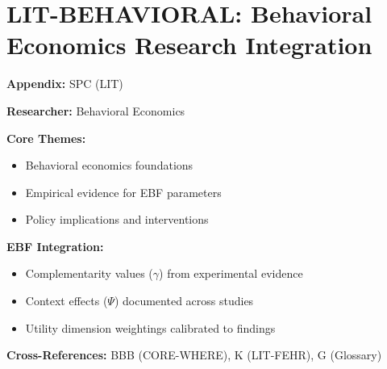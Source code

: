 %
%

\chapter{LIT-BEHAVIORAL: Behavioral Economics Research Integration}
\label{app:spc}

\begin{abstract}
This appendix integrates the research contributions of Behavioral Economics into the
Evidence-Based Framework. It documents key papers, core findings, and their
integration with EBF dimensions including complementarity parameters ($\gamma$),
context factors ($\Psi$), and utility dimensions.
\end{abstract}

\begin{tcolorbox}[colback=blue!5!white, colframe=blue!75!black,
    title=Quick Reference: Behavioral Economics Research]

\textbf{Appendix:} SPC (LIT)

\textbf{Researcher:} Behavioral Economics

\textbf{Core Themes:}
\begin{itemize}[nosep]
\item Behavioral economics foundations
\item Empirical evidence for EBF parameters
\item Policy implications and interventions
\end{itemize}

\textbf{EBF Integration:}
\begin{itemize}[nosep]
\item Complementarity values ($\gamma$) from experimental evidence
\item Context effects ($\Psi$) documented across studies
\item Utility dimension weightings calibrated to findings
\end{itemize}

\textbf{Cross-References:} BBB (CORE-WHERE), K (LIT-FEHR), G (Glossary)
\end{tcolorbox}

